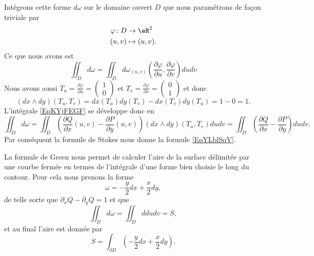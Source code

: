 Intégrons cette forme \( d\omega\) sur le domaine ouvert \( D\) que nous paramétrons de façon triviale par
\begin{equation}
    \begin{aligned}
        \varphi\colon D&\to \eR^2 \\
        (u,v)&\mapsto (u,v).
    \end{aligned}
\end{equation}
Ce que nous avons est
\begin{equation}\label{EqKYjFEGF}
    \iint_D d\omega=\iint_D d\omega_{(u,v)}\left( \frac{ \partial \varphi }{ \partial u },\frac{ \partial \varphi }{ \partial v } \right)dudv
\end{equation}
Nous avons aussi \( T_u=\frac{ \partial \varphi }{ \partial u }=\begin{pmatrix}
    1    \\
    0
\end{pmatrix}\) et \(T_v= \frac{ \partial \varphi }{ \partial v }=\begin{pmatrix}
    0    \\
      1
\end{pmatrix}\) et donc
\begin{equation}
    (dx\wedge dy)(T_u,T_v)=dx(T_u)dy(T_v)-dx(T_v)dy(T_u)=1-0=1.
\end{equation}
L'intégrale \eqref{EqKYjFEGF} se développe donc en
\begin{equation}
    \iint_Dd\omega=\iint_D\left( \frac{ \partial Q }{ \partial x }(u,v)-\frac{ \partial P }{ \partial y }(u,v) \right)(dx\wedge dy)(T_u,T_v)dudv=\iint_D\left( \frac{ \partial Q }{ \partial x }-\frac{ \partial P }{ \partial y } \right)dudv.
\end{equation}
Par conséquent la formule de Stokes nous donne la formule \eqref{EqYLblSqV}.

La formule de Green nous permet de calculer l'aire de la surface délimitée par une courbe fermée en termes de l'intégrale d'une forme bien choisie le long du contour. Pour cela nous prenons la forme
\begin{equation}    \label{EqZNXYMQb}
    \omega=-\frac{ y }{2}dx+\frac{ x }{2}dy,
\end{equation}
de telle sorte que \( \partial_xQ-\partial_yQ=1\) et que
\begin{equation}
    \iint_Dd\omega=\iint_Dddudv=S,
\end{equation}
et au final l'aire est donnée par
\begin{equation}
    S=\int_{\partial D}\left( -\frac{ y }{2}dx+\frac{ x }{2}dy \right).
\end{equation}

